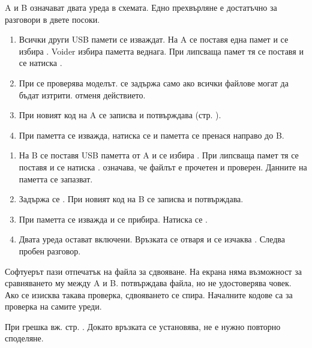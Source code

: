 A и B означават двата уреда в схемата. Едно прехвърляне е достатъчно за разговори в двете посоки.
\begin{enumerate}
\item Всички други USB памети се изваждат. На A се поставя една памет и се избира  \arr {}. Voider избира паметта веднага. При липсваща памет тя се поставя и се натиска .
\item При  се проверява моделът.  се задържа само ако всички файлове могат да бъдат изтрити.  отменя действието.
\item При  новият код на A се записва и потвърждава (стр. \pageref{bg:check}).
\item При  паметта се изважда, натиска се  и паметта се пренася направо до B.
\end{enumerate}

\begin{enumerate}
\item На B се поставя USB паметта от A и се избира  \arr {}. При липсваща памет тя се поставя и се натиска .  означава, че файлът е прочетен и проверен. Данните на паметта се запазват.
\item Задържа се . При  новият код на B се записва и потвърждава.
\item При  паметта се изважда и се прибира. Натиска се .
\item Двата уреда остават включени. Връзката се отваря и се изчаква . Следва пробен разговор.
\end{enumerate}
Софтуерът пази отпечатък на файла за сдвояване. На екрана няма възможност за сравняването му между A и B.  потвърждава файла, но не удостоверява човек. Ако се изисква такава проверка, сдвояването се спира. Началните кодове са за проверка на самите уреди.

При грешка вж. стр. \pageref{bg:help}. Докато връзката се установява, не е нужно повторно споделяне.

